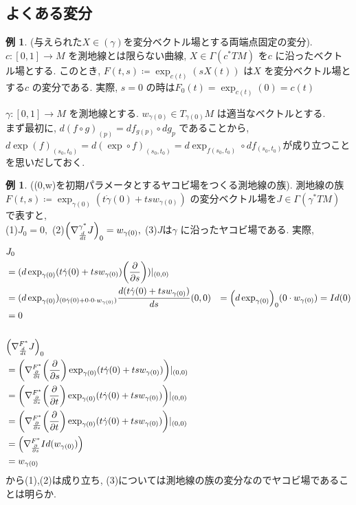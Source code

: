 \documentclass[10pt, fleqn, label-section=none]{bxjsarticle}
\theoremstyle{definition}
\newtheorem{ex}[dfn]{例}
\newcommand{\paren}[1]{\mleft( #1\mright )}
\renewcommand{\-}{\hyphen}
\begin{document}
\subsection{よくある変分}

\begin{ex}(与えられた$X \in (\gamma)$を変分ベクトル場とする両端点固定の変分). 
$c: [0,1] \rightarrow M$ を測地線とは限らない曲線, $X \in \Gamma(c^* TM)$ を$c$ に沿ったベクトル場とする. 
このとき, $F(t,s) \coloneqq \exp_{c(t)} (s X(t))$ は$X$ を変分ベクトル場とする$c$ の変分である. 
実際, $s = 0$ の時は$F_0 (t) = \exp_{c(t)} (0) = c(t)$ 
\end{ex}


$\gamma : [0,1] \rightarrow M$ を測地線とする. $w_{\gamma(0)} \in T_{\gamma(0)} M$ は適当なベクトルとする. \\まず最初に, 
$d(f \circ g)_(p) = df_{g(p)} \circ dg_{p}$ であることから, \\ $d{\exp(f)}_{(s_0,t_0)}= d(\exp \circ f )_{(s_0, t_0)} = d\exp_{f(s_0, t_0)} \circ df_{(s_0, t_0)} $が成り立つことを思いだしておく.



\begin{ex}((0,w)を初期パラメータとするヤコビ場をつくる測地線の族). 
測地線の族 $F(t,s) \coloneqq \exp _{\gamma(0)} (t\dot \gamma(0) + ts w_{\gamma(0)} ) $ の変分ベクトル場を$J \in \Gamma(\gamma ^* TM)$ で表すと, \\
(1)$J_0 = 0,$ (2)$\paren{\nabla ^{\gamma ^* }_{\frac{d}{dt}} J }_0 = w_{\gamma(0)},$ (3)$J$は$\gamma$ に沿ったヤコビ場である. 
実際, 
\begin{align*}
&J_0 \\
&= (d\exp_{\gamma(0)}(t\dot \gamma(0) + tsw_{\gamma(0)}) \paren{\frac{\partial}{\partial s} })|_{(0,0)} \\
&= (d\exp_{\gamma(0)})_{(0\dot\gamma(0) + 0 \cdot 0 \cdot w_{\gamma(0)})} \frac{d(t\dot\gamma(0) + tsw_{\gamma(0)})}{ds} (0,0) 
&=   \paren{d \exp _{\gamma(0)}}_{0} (0\cdot w_{\gamma(0)}) = Id(0) \\
&= 0 \quad  \\
\\
&\paren{\nabla^{F^*}_{\frac{d}{d t}} J }_0 \\
&= \paren{\nabla^{F^*}_{\frac{\partial}{\partial t}} \paren{\frac{\partial}{\partial s}} \exp _{\gamma(0)} (t\dot \gamma(0) + tsw_{\gamma(0)}) }|_{(0,0)} \\
&= \paren{\nabla^{F^*}_{\frac{\partial}{\partial s}} \paren{\frac{\partial}{\partial t}} \exp _{\gamma(0)} (t\dot \gamma(0) + tsw_{\gamma(0)}) }|_{(0,0)} \\
&= \paren{\nabla^{F^*}_{\frac{\partial}{\partial s}} \paren{\frac{\partial}{\partial t}} \exp _{\gamma(0)} (t\dot \gamma(0) + tsw_{\gamma(0)}) }|_{(0,0)} \\
&= \paren{\nabla^{F^*}_{\frac{\partial}{\partial s}} Id (w_{\gamma (0)})  } \\
& = w_{\gamma(0)}
\end{align*}
から(1),(2)は成り立ち, (3)については測地線の族の変分なのでヤコビ場であることは明らか.
\end{ex}
\end{document}

